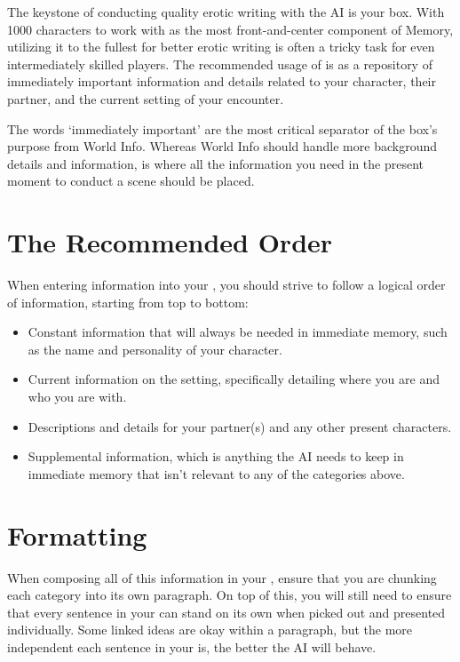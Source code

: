 ﻿\documentclass[Coomer-main.tex]{subfiles}
\begin{document}
The keystone of conducting quality erotic writing with the AI is your \rem box.
With 1000 characters to work with as the most front-and-center component of Memory, utilizing it to the fullest for better erotic writing is often a tricky task for even intermediately skilled players.
The recommended usage of \rem is as a repository of immediately important information and details related to your character, their partner, and the current setting of your encounter.

The words ‘immediately important’ are the most critical separator of the \rem box's purpose from World Info.
Whereas World Info should handle more background details and information, \rem is where all the information you need in the present moment to conduct a scene should be placed.

\section{The Recommended Order}

When entering information into your \rem, you should strive to follow a logical order of information, starting from top to bottom:

\begin{itemize}
	
\item Constant information that will always be needed in immediate memory, such as the name and personality of your character.

\item Current information on the setting, specifically detailing where you are and who you are with.

\item Descriptions and details for your partner(s) and any other present characters.

\item Supplemental information, which is anything the AI needs to keep in immediate memory that isn't relevant to any of the categories above.

\end{itemize}

\section{Formatting}

When composing all of this information in your \rem, ensure that you are chunking each category into its own paragraph.
On top of this, you will still need to ensure that every sentence in your \rem can stand on its own when picked out and presented individually.
Some linked ideas are okay within a paragraph, but the more independent each sentence in your \rem is, the better the AI will behave.
\end{document}
